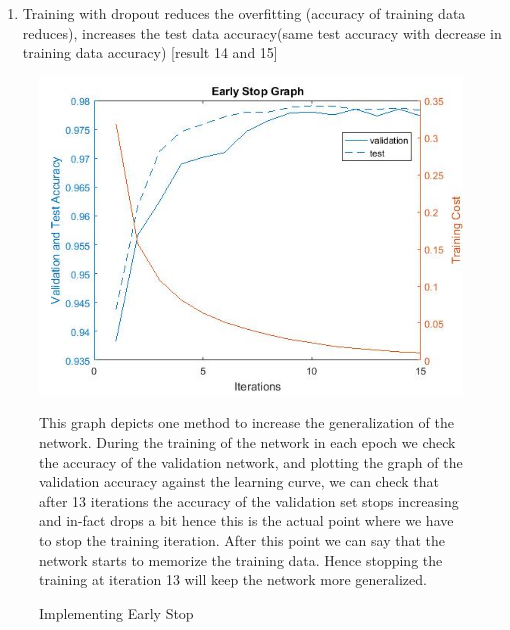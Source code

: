 \documentclass[conference]{IEEEtran}
\begin{document}
\begin{enumerate}
\item Training with dropout reduces the overfitting (accuracy of training data reduces), increases the test data accuracy(same test accuracy with decrease in training data accuracy) [result 14 and 15]
\end{enumerate}

\begin{figure}
\includegraphics[scale=0.45]{EarlyStopGraph2.jpg}
\caption{Implementing Early Stop}
\footnotesize{This graph depicts one method to increase the generalization of the network. During the training of the network in each epoch we check the accuracy of the validation network,  and plotting the graph of the validation accuracy against the learning curve, we can check that after 13 iterations the accuracy of the validation set stops increasing and in-fact drops a bit hence this is the actual point where we have to stop the training iteration. After this point we can say that the network starts to memorize the training data. Hence stopping the training at iteration 13 will keep the network more generalized. \\ 
}
\label{Early Stop}
\end{figure}
\end{document}
